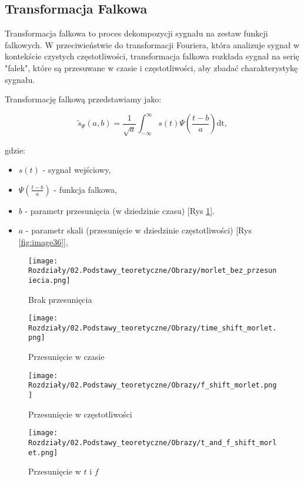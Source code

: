 \subsection*{Transformacja Falkowa}

Transformacja falkowa to proces dekompozycji sygnału na zestaw funkcji falkowych. W przeciwieństwie do transformacji Fouriera, która analizuje sygnał w kontekście czystych częstotliwości, transformacja falkowa rozkłada sygnał na serię "falek", które są przesuwane w czasie i częstotliwości, aby zbadać charakterystykę sygnału.


Transformację falkową przedstawiamy jako:

\begin{equation}
    \tilde{s}_{\Psi}(a, b)=\frac{1}{\sqrt{a}} \int_{-\infty}^{\infty} s(t) \Psi\left(\frac{t-b}{a}\right) \mathrm{dt},
\end{equation}

gdzie:
\begin{itemize}
    \item $s(t)$ - sygnał wejściowy,
    \item $\Psi\left(\frac{t-b}{a}\right)$ - funkcja falkowa,
    \item $b$ - parametr przesunięcia (w dziedzinie czasu) [Rys \ref{fig:image35}].
    \item $a$ - parametr skali (przesunięcie w dziedzinie częstotliwości) [Rys \ref{fig:image36}],
\end{itemize}


\begin{figure}[H]
    \centering
    \begin{minipage}[t]{0.47\linewidth}
        \texttt{[image: Rozdziały/02.Podstawy\_teoretyczne/Obrazy/morlet\_bez\_przesuniecia.png]}
        \caption{Brak przesunięcia}
        \label{fig:image34}
    \end{minipage}
    \centering
    \begin{minipage}[t]{0.47\linewidth}
        \texttt{[image: Rozdziały/02.Podstawy\_teoretyczne/Obrazy/time\_shift\_morlet.png]}
        \caption{Przesunięcie w czasie}
        \label{fig:image35}
    \end{minipage}
\end{figure}

\begin{figure}[H]
    \centering
    \begin{minipage}[t]{0.46\linewidth}
        \texttt{[image: Rozdziały/02.Podstawy\_teoretyczne/Obrazy/f\_shift\_morlet.png]}
        \caption{Przesunięcie w częstotliwości}
        \label{fig:image36}
    \end{minipage}
    \centering
    \begin{minipage}[t]{0.46\linewidth}
        \texttt{[image: Rozdziały/02.Podstawy\_teoretyczne/Obrazy/t\_and\_f\_shift\_morlet.png]}
        \caption{Przesunięcie w $t$ i $f$}
        \label{fig:image37}
    \end{minipage}
\end{figure}


